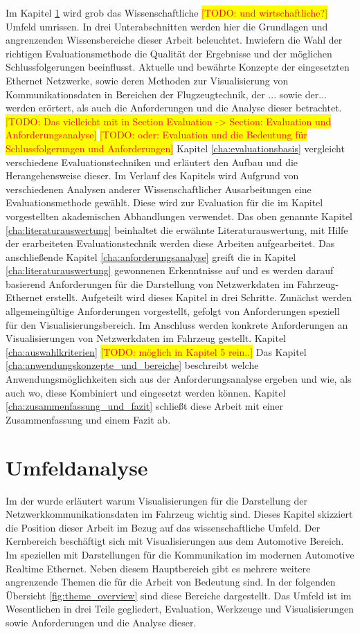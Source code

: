 \documentclass[draft=false
              ,paper=a4
              ,twoside=false
              ,fontsize=11pt
              ,headsepline
              ,BCOR10mm
              ,DIV11
              ]{scrbook}
\newcommand{\TODO}[1]{\colorbox{yellow}{\textcolor{red}{[TODO: #1]}}}
\begin{document}
Im Kapitel \ref{cha:umfeldanalyse} wird grob das Wissenschaftliche \TODO{und wirtschaftliche?} Umfeld umrissen. In drei Unterabschnitten werden hier die Grundlagen und angrenzenden Wissensbereiche dieser Arbeit beleuchtet. Inwiefern die Wahl der richtigen Evaluationsmethode die Qualität der Ergebnisse und der möglichen Schlussfolgerungen beeinflusst. Aktuelle und bewährte Konzepte der eingesetzten Ethernet Netzwerke, sowie deren Methoden zur Visualisierung von Kommunikationsdaten in Bereichen der Flugzeugtechnik, der ... sowie der... werden erörtert, als auch die Anforderungen und die Analyse dieser betrachtet. \TODO{Das vielleicht mit in Section Evaluation -> Section: Evaluation und Anforderungsanalyse} \TODO{oder: Evaluation und die Bedeutung für Schlussfolgerungen und Anforderungen}
Kapitel \ref{cha:evaluationsbasis} vergleicht verschiedene Evaluationstechniken und erläutert den Aufbau und die Herangehensweise dieser. Im Verlauf des Kapitels wird Aufgrund von verschiedenen Analysen anderer Wissenschaftlicher Ausarbeitungen eine Evaluationsmethode gewählt. Diese wird zur Evaluation für die im Kapitel  vorgestellten akademischen Abhandlungen verwendet. Das oben genannte Kapitel \ref{cha:literaturauswertung} beinhaltet die erwähnte Literaturauswertung, mit Hilfe der erarbeiteten Evaluationstechnik werden diese Arbeiten aufgearbeitet. Das anschließende Kapitel \ref{cha:anforderungsanalyse} greift die in Kapitel \ref{cha:literaturauswertung} gewonnenen Erkenntnisse auf und es werden darauf basierend Anforderungen für die Darstellung von Netzwerkdaten im Fahrzeug-Ethernet erstellt. Aufgeteilt wird dieses Kapitel in drei Schritte. Zunächst werden allgemeingültige Anforderungen vorgestellt, gefolgt von Anforderungen speziell für den Visualisierungsbereich. Im Anschluss werden konkrete Anforderungen an Visualisierungen von Netzwerkdaten im Fahrzeug gestellt. Kapitel \ref{cha:auswahlkriterien} \TODO{möglich in Kapitel 5 rein..}
Das Kapitel \ref{cha:anwendungskonzepte_und_bereiche} beschreibt welche Anwendungsmöglichkeiten sich aus der Anforderungsanalyse ergeben und wie, als auch wo, diese Kombiniert und eingesetzt werden können. Kapitel \ref{cha:zusammenfassung_und_fazit} schließt diese Arbeit mit einer Zusammenfassung und einem Fazit ab.

\chapter{Umfeldanalyse} %
\label{cha:umfeldanalyse}
Im der  wurde erläutert warum Visualisierungen für die Darstellung der Netzwerkkommunikationsdaten im Fahrzeug wichtig sind. Dieses Kapitel skizziert die Position dieser Arbeit im Bezug auf das wissenschaftliche Umfeld. Der Kernbereich beschäftigt sich mit Visualisierungen aus dem Automotive Bereich. Im speziellen mit Darstellungen für die Kommunikation im modernen Automotive Realtime Ethernet. Neben diesem Hauptbereich gibt es mehrere weitere angrenzende Themen die für die Arbeit von Bedeutung sind. In der folgenden Übersicht \ref{fig:theme_overview} sind diese Bereiche dargestellt. Das Umfeld ist im Wesentlichen in drei Teile gegliedert, Evaluation, Werkzeuge und Visualisierungen sowie Anforderungen und die Analyse dieser. 
\end{document}
